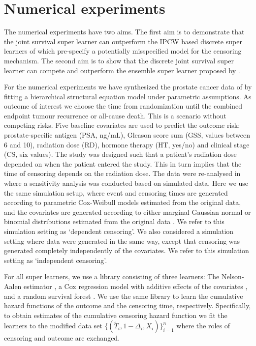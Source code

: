 \documentclass[alpha-refs]{wiley-article}
\newcommand{\1}{\mathbb{1}}
\begin{document}
\section{Numerical experiments}
\label{sec:numer-exper}

The numerical experiments have two aims. The first aim is to
demonstrate that the joint survival super learner can outperform the
IPCW based discrete super learners of \citep{gonzalez2021stacked}
which pre-specify a potentially misspecified model for the censoring
mechanism. The second aim is to show that the discrete joint survival
super learner can compete and outperform the ensemble super learner
proposed by \cite{westling2021inference}.

For the numerical experiments we have synthesized the prostate cancer
data of \cite{kattan2000pretreatment} by fitting a hierarchical
structural equation model under parametric assumptions. As outcome of
interest we choose the time from randomization until the combined
endpoint tumour recurrence or all-cause death. This is a scenario
without competing risks. Five baseline covariates are used to predict
the outcome risk: prostate-specific antigen (PSA, ng/mL), Gleason
score sum (GSS, values between 6 and 10), radiation dose (RD), hormone
therapy (HT, yes/no) and clinical stage (CS, six values). The study
was designed such that a patient's radiation dose depended on when the
patient entered the study. This in turn implies that the time of
censoring depends on the radiation dose. The data were re-analysed in
\citep{gerds2013estimating} where a sensitivity analysis was conducted
based on simulated data. Here we use the same simulation setup, where
event and censoring times are generated according to parametric
Cox-Weibull models \citep{Bender2005} estimated from the original
data, and the covariates are generated according to either marginal
Gaussian normal or binomial distributions estimated from the original
data \citep[c.f.,][Section~4.6]{gerds2013estimating}. We refer to this
simulation setting as `dependent censoring'. We also considered a
simulation setting where data were generated in the same way, except
that censoring was generated completely independently of the
covariates. We refer to this simulation setting as `independent
censoring'.

For all super learners, we use a library consisting of three learners:
The Nelson-Aalen estimator \citep{andersen2012statistical}, a Cox
regression model with additive effects of the covariates
\citep{cox1972regression}, and a random survival forest
\citep{ishwaran2008random}. We use the same library to learn the
cumulative hazard functions of the outcome and the censoring time,
respectively. Specifically, to obtain estimates of the cumulative
censoring hazard function we fit the learners to the modified data set
\(\{(\tilde{T}_i, 1-\Delta_i, X_i)\}_{i=1}^n \) where the roles of
censoring and outcome are exchanged.
\end{document}
